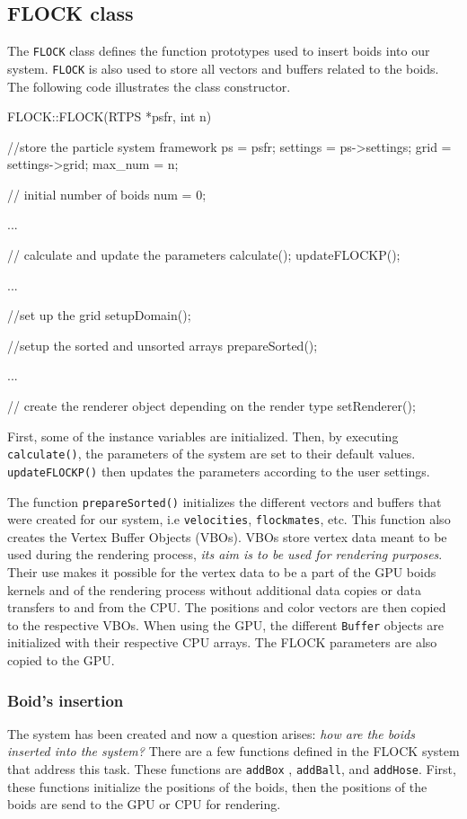 \subsection{FLOCK class}
The \texttt{FLOCK} class defines the function prototypes used to insert boids into our system. \texttt{FLOCK} is also used to store all vectors and buffers related to the boids. The following code illustrates the class constructor. 

\begin{cppcode}{0}
FLOCK::FLOCK(RTPS *psfr, int n)
 {
 	//store the particle system framework
 	ps = psfr;
	settings = ps->settings;
	grid = settings->grid;
	max_num = n;
	
	// initial number of boids
	num = 0;
 	
	...
 
 	// calculate and update the parameters
	calculate();
	updateFLOCKP();

	...

	//set up the grid
	setupDomain();
	
	//setup the sorted and unsorted arrays
	prepareSorted();
 	 
	 ...
		
	// create the renderer object depending on the render type		
	setRenderer(); 
}
\end{cppcode}
\vspace{16pt}

First, some of the instance variables are initialized. Then, by executing \texttt{calculate()}, the parameters of the system are set to their default values. \texttt{updateFLOCKP()} then updates the parameters according to the user settings.

The function \texttt{prepareSorted()} initializes the different vectors and buffers that were created for our system, i.e \texttt{velocities}, \texttt{flockmates}, etc. This function also creates the Vertex Buffer Objects (VBOs). VBOs store vertex data meant to be used during the rendering process, {\em its aim is to be used for rendering purposes}\cite{vbo}. Their use makes it possible for the vertex data to be a part of the GPU boids kernels and of the rendering process without additional data copies or data transfers to and from the CPU. The positions and color vectors are then copied to the respective VBOs. When using the GPU, the different \texttt{Buffer} objects are initialized with their respective CPU arrays. The FLOCK parameters are also copied to the GPU. 

\subsubsection{Boid's insertion}
The system has been created and now a question arises: \textit{how are the boids inserted into the system?} There are a few functions defined in the FLOCK system that address this task. These functions are \texttt{addBox} , \texttt{addBall}, and \texttt{addHose}. First, these functions initialize the positions of the boids, then the positions of the boids are send to the GPU or CPU for rendering. 

